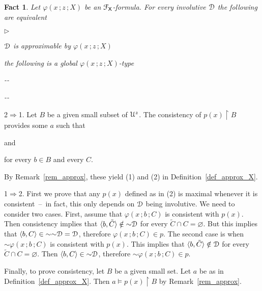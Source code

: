 \documentclass{amsproc}
\makeatletter
\newcommand{\mylabel}[1]{{#1}\hfill}
\renewenvironment{itemize}
  {\begin{list}{$\triangleright$}{%
  \setlength{\parskip}{0mm}
  \setlength{\topsep}{.1\baselineskip}
  \setlength{\rightmargin}{0mm}
  \setlength{\listparindent}{0mm}
  \setlength{\itemindent}{0mm}
  \setlength{\labelwidth}{3ex}
  \setlength{\itemsep}{.1\baselineskip}
  \setlength{\parsep}{.1\baselineskip}
  \setlength{\partopsep}{0mm}
  \setlength{\labelsep}{1ex}
  \setlength{\leftmargin}{\labelwidth+\labelsep}
  \let\makelabel\mylabel}}{%
\end{list}}
\newcounter{thm}
\theoremstyle{mio}
\newtheorem{fact}[thm]{Fact}\tcolorboxenvironment{fact}{mythm}
\providecommand{\proofNameStyle}{\bfseries}
\renewenvironment{proof}[1][\proofname]{\par
  \pushQED{\qed}%
  \normalfont%
  \trivlist
  \item[\hskip\labelsep
        \proofNameStyle
    #1\@addpunct{.}]\ignorespaces
}{%
  \popQED\endtrivlist\@endpefalse
}
\makeatother
\begin{document}
\begin{fact}
  Let $\varphi(x\,;z\,;X)$ be an ${\EuScript F}_{\sf X}$-formula.
  For every involutive ${\EuScript D}$ the following are equivalent
  \begin{itemize}
    \item [1.] ${\EuScript D}$ is approximable by $\varphi(x\,;z\,;X)$
    \item [2.] the following is a global $\varphi(x\,;z\,;X)$-type\smallskip
    
    \noindent\kern-\kern-
    \smallskip

    \noindent\kern-\kern-
  
  \end{itemize}
\end{fact}

\begin{proof}
  2$\Rightarrow$1.
  Let $B$ be a given small subset of ${\EuScript U}^z$.
  The consistency of $p(x)\restriction B$ provides some $a$ such that

  \quad and 
  
  \hfill for every $b\in B$ and every $C$. 

  By Remark~\ref{rem_approx}, these yield (1) and (2) in Definition~\ref{def_approx_X}.
  
  1$\Rightarrow$2.
  First we prove that any $p(x)$ defined as in (2) is maximal whenever it is consistent~--~in fact, this only depends on ${\EuScript D}$ being involutive.
  We need to consider two cases.
  First, assume that $\varphi(x\,;b\,;C)$ is consistent with $p(x)$.
  Then consistency implies that $\langle b,\tilde C\rangle\notin{\sim}{\EuScript D}$ for every $\tilde C\cap C=\varnothing$.
  But this implies that $\langle b, C\rangle\in{\sim}{\sim}{\EuScript D}={\EuScript D}$, therefore $\varphi(x\,;b\,;C)\in p$.
  The second case is when ${\sim}\varphi(x\,;b\,;C)$ is consistent with $p(x)$.
  This implies that $\langle b,\tilde C\rangle\notin{\EuScript D}$ for every $\tilde C\cap C=\varnothing$.
  Then $\langle b,C\rangle\in{\sim}{\EuScript D}$, therefore ${\sim}\varphi(x\,;b\,;C)\in p$.

  Finally, to prove consistency, let $B$ be a given small set.
  Let $a$ be as in Definition~\ref{def_approx_X}.
  Then $a\models p(x)\restriction B$ by Remark~\ref{rem_approx}.
\end{proof}
\end{document}
